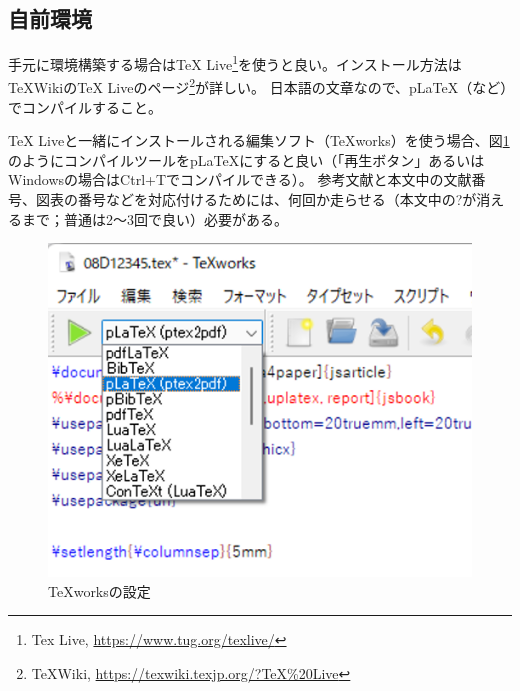 \documentclass[twocolumn, a4paper]{jsarticle}
\begin{document}
\subsection*{自前環境}
手元に環境構築する場合はTeX Live\footnote{Tex Live, \url{https://www.tug.org/texlive/}}を使うと良い。インストール方法は\TeX WikiのTeX Liveのページ\footnote{\TeX Wiki, \url{https://texwiki.texjp.org/?TeX%20Live}}が詳しい。 
日本語の文章なので、pLaTeX（など）でコンパイルすること。

TeX Liveと一緒にインストールされる編集ソフト（TeXworks）を使う場合、図\ref{fig:texworks}のようにコンパイルツールをpLaTeXにすると良い（「再生ボタン」あるいはWindowsの場合はCtrl+Tでコンパイルできる）。
参考文献と本文中の文献番号、図表の番号などを対応付けるためには、何回か走らせる（本文中の?が消えるまで；普通は2～3回で良い）必要がある。

\begin{figure}[t]
\centering
\includegraphics[width=\linewidth]{texworks.png}
\caption{TeXworksの設定}
\label{fig:texworks}
\end{figure}
\end{document}
